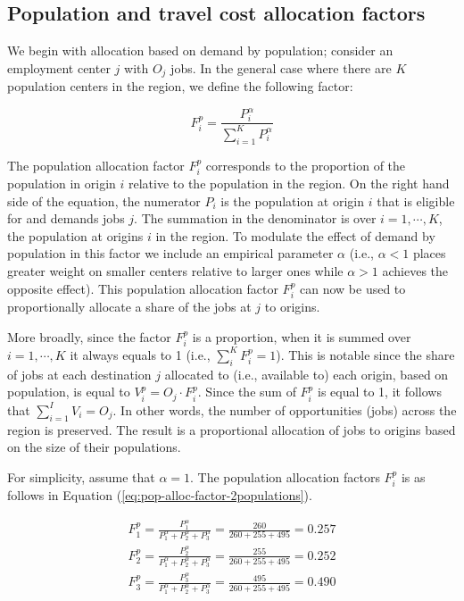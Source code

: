 \documentclass[]{elsarticle} %
\begin{document}
\hypertarget{population-and-travel-cost-allocation-factors}{%
\subsection{Population and travel cost allocation
factors}\label{population-and-travel-cost-allocation-factors}}

We begin with allocation based on demand by population; consider an
employment center \(j\) with \(O_j\) jobs. In the general case where
there are \(K\) population centers in the region, we define the
following factor:

\begin{equation}
\label{eq:pop-alloc-factor}
F^p_{i} = \frac{P_{i}^\alpha}{\sum_{i=1}^K P_{i}^\alpha}
\end{equation}

The population allocation factor \(F^p_{i}\) corresponds to the
proportion of the population in origin \(i\) relative to the population
in the region. On the right hand side of the equation, the numerator
\(P_{i}\) is the population at origin \(i\) that is eligible for and
demands jobs \(j\). The summation in the denominator is over
\(i=1,\cdots,K\), the population at origins \(i\) in the region. To
modulate the effect of demand by population in this factor we include an
empirical parameter \(\alpha\) (i.e., \(\alpha <1\) places greater
weight on smaller centers relative to larger ones while \(\alpha>1\)
achieves the opposite effect). This population allocation factor
\(F^p_{i}\) can now be used to proportionally allocate a share of the
jobs at \(j\) to origins.

More broadly, since the factor \(F^p_{i}\) is a proportion, when it is
summed over \(i=1,\cdots,K\) it always equals to 1 (i.e.,
\(\sum_i^{K} F^p_{i} = 1\)). This is notable since the share of jobs at
each destination \(j\) allocated to (i.e., available to) each origin,
based on population, is equal to \(V^p_{i} = O_j \cdot F^p_{i}\). Since
the sum of \(F^p_{i}\) is equal to 1, it follows that
\(\sum_{i=1}^I V_{i} = O_j\). In other words, the number of
opportunities (jobs) across the region is preserved. The result is a
proportional allocation of jobs to origins based on the size of their
populations.

For simplicity, assume that \(\alpha=1\). The population allocation
factors \(F^p_{i}\) is as follows in Equation
(\ref{eq:pop-alloc-factor-2populations}).

\begin{equation}
\label{eq:pop-alloc-factor-2populations}
\begin{array}{l}
F^p_{1} = \frac{P_1 ^\alpha}{P_1^\alpha + P_2^\alpha + P_3^\alpha} = \frac{260}{260 + 255 + 495} = 0.257\\
F^p_{2} = \frac{P_2^\alpha}{P_1^\alpha + P_2^\alpha + P_3^\alpha}  = \frac{255}{260 + 255 + 495} = 0.252\\
F^p_{3} = \frac{P_3^\alpha}{P_1^\alpha + P_2^\alpha + P_3^\alpha}  = \frac{495}{260 + 255 + 495} = 0.490\\
\end{array}
\end{equation}
\end{document}
